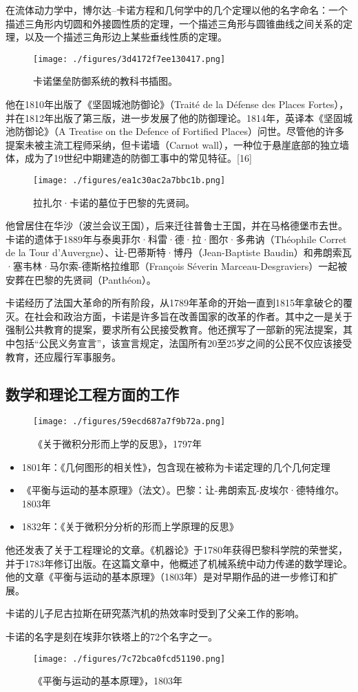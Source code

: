 在流体动力学中，博尔达–卡诺方程和几何学中的几个定理以他的名字命名：一个描述三角形内切圆和外接圆性质的定理，一个描述三角形与圆锥曲线之间关系的定理，以及一个描述三角形边上某些垂线性质的定理。
\begin{figure}[ht]
\centering
\texttt{[image: ./figures/3d4172f7ee130417.png]}
\caption{卡诺堡垒防御系统的教科书插图。} \label{fig_Lazare_4}
\end{figure}
他在1810年出版了《坚固城池防御论》（Traité de la Défense des Places Fortes），并在1812年出版了第三版，进一步发展了他的防御理论。1814年，英译本《坚固城池防御论》（A Treatise on the Defence of Fortified Places）问世。尽管他的许多提案未被主流工程师采纳，但卡诺墙（Carnot wall），一种位于悬崖底部的独立墙体，成为了19世纪中期建造的防御工事中的常见特征。[16]
\begin{figure}[ht]
\centering
\texttt{[image: ./figures/ea1c30ac2a7bbc1b.png]}
\caption{拉扎尔·卡诺的墓位于巴黎的先贤祠。} \label{fig_Lazare_5}
\end{figure}
他曾居住在华沙（波兰会议王国），后来迁往普鲁士王国，并在马格德堡市去世。卡诺的遗体于1889年与泰奥菲尔·科雷·德·拉·图尔·多弗讷（Théophile Corret de la Tour d'Auvergne）、让-巴蒂斯特·博丹（Jean-Baptiste Baudin）和弗朗索瓦·塞韦林·马尔索-德斯格拉维耶（François Séverin Marceau-Desgraviers）一起被安葬在巴黎的先贤祠（Panthéon）。

卡诺经历了法国大革命的所有阶段，从1789年革命的开始一直到1815年拿破仑的覆灭。在社会和政治方面，卡诺是许多旨在改善国家的改革的作者。其中之一是关于强制公共教育的提案，要求所有公民接受教育。他还撰写了一部新的宪法提案，其中包括“公民义务宣言”，该宣言规定，法国所有20至25岁之间的公民不仅应该接受教育，还应履行军事服务。
\subsection{数学和理论工程方面的工作}
\begin{figure}[ht]
\centering
\texttt{[image: ./figures/59ecd687a7f9b72a.png]}
\caption{《关于微积分形而上学的反思》，1797年} \label{fig_Lazare_6}
\end{figure}
\begin{itemize}
\item 1801年：《几何图形的相关性》，包含现在被称为卡诺定理的几个几何定理  
\item 《平衡与运动的基本原理》（法文）。巴黎：让-弗朗索瓦-皮埃尔·德特维尔。1803年  
\item 1832年：《关于微积分分析的形而上学原理的反思》
\end{itemize}
他还发表了关于工程理论的文章。《机器论》于1780年获得巴黎科学院的荣誉奖，并于1783年修订出版。在这篇文章中，他概述了机械系统中动力传递的数学理论。他的文章《平衡与运动的基本原理》（1803年）是对早期作品的进一步修订和扩展。

卡诺的儿子尼古拉斯在研究蒸汽机的热效率时受到了父亲工作的影响。

卡诺的名字是刻在埃菲尔铁塔上的72个名字之一。

\begin{figure}[ht]
\centering
\texttt{[image: ./figures/7c72bca0fcd51190.png]}
\caption{《平衡与运动的基本原理》，1803年} \label{fig_Lazare_7}
\end{figure}
